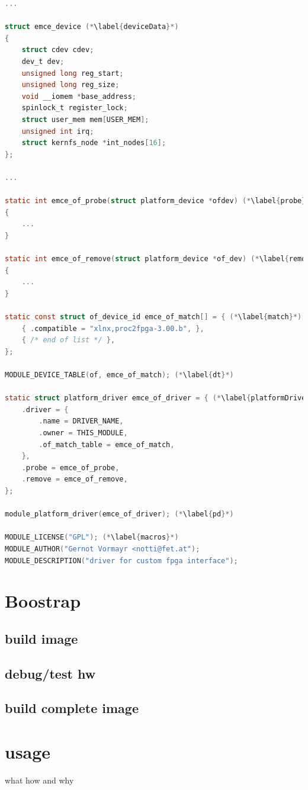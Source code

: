 \documentclass[11pt,technote,a4paper,onecolumn,dvips]{IEEEtran}
\begin{document}
\begin{lstlisting}[float,language=C,caption={Basic elements of a platform driver module},label=src:pdriver,basicstyle=\ttfamily\tiny]
...

struct emce_device (*\label{deviceData}*)
{
	struct cdev cdev;
	dev_t dev;
	unsigned long reg_start;
	unsigned long reg_size;
	void __iomem *base_address;
	spinlock_t register_lock;
	struct user_mem mem[USER_MEM];
	unsigned int irq;
	struct kernfs_node *int_nodes[16];
};

...

static int emce_of_probe(struct platform_device *ofdev) (*\label{probe}*)
{
	...
}

static int emce_of_remove(struct platform_device *of_dev) (*\label{remove}*)
{
	...
}

static const struct of_device_id emce_of_match[] = { (*\label{match}*)
	{ .compatible = "xlnx,proc2fpga-3.00.b", },
	{ /* end of list */ },
};

MODULE_DEVICE_TABLE(of, emce_of_match); (*\label{dt}*)

static struct platform_driver emce_of_driver = { (*\label{platformDriver}*)
	.driver = {
		.name = DRIVER_NAME,
		.owner = THIS_MODULE,
		.of_match_table = emce_of_match,
	},
	.probe = emce_of_probe,
	.remove = emce_of_remove,
};

module_platform_driver(emce_of_driver); (*\label{pd}*)

MODULE_LICENSE("GPL"); (*\label{macros}*)
MODULE_AUTHOR("Gernot Vormayr <notti@fet.at");
MODULE_DESCRIPTION("driver for custom fpga interface");
\end{lstlisting}
\section{Boostrap}
\subsection{build image}
\subsection{debug/test hw}
\subsection{build complete image}
\section{usage}
what how and why
\end{document}
